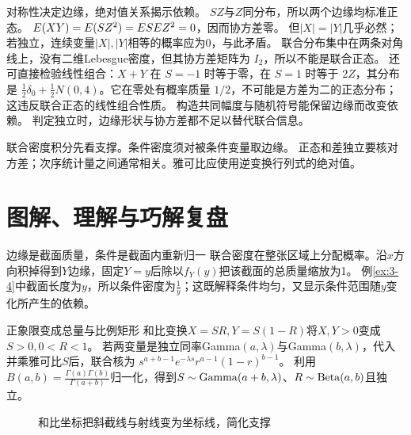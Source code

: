 {对称性决定边缘，绝对值关系揭示依赖。}
{$SZ$与$Z$同分布，所以两个边缘均标准正态。
$E(XY)=E(SZ^2)=E SE Z^2=0$，因而协方差零。
但$|X|=|Y|$几乎必然；若独立，连续变量$|X|,|Y|$相等的概率应为0，与此矛盾。
联合分布集中在两条对角线上，没有二维Lebesgue密度，但其协方差矩阵为 $I_2$，所以不能是联合正态。
还可直接检验线性组合：$X+Y$ 在 $S=-1$ 时等于零，在 $S=1$ 时等于 $2Z$，其分布是 $\tfrac12\delta_0+\tfrac12N(0,4)$。它在零处有概率质量 $1/2$，不可能是方差为二的正态分布；这违反联合正态的线性组合性质。}
{构造共同幅度与随机符号能保留边缘而改变依赖。}
{判定独立时，边缘形状与协方差都不足以替代联合信息。}
\begin{warning}
联合密度积分先看支撑。条件密度须对被条件变量取边缘。
正态和差独立要核对方差；次序统计量之间通常相关。雅可比应使用逆变换行列式的绝对值。
\end{warning}

\section*{图解、理解与巧解复盘}
\begin{insight}{边缘是截面质量，条件是截面内重新归一}
联合密度在整张区域上分配概率。沿$x$方向积掉得到$Y$边缘，固定$Y=y$后除以$f_Y(y)$把该截面的总质量缩放为1。
例\ref{ex:3-4}中截面长度为$y$，所以条件密度为$\frac{1}{y}$；这既解释条件均匀，又显示条件范围随$y$变化所产生的依赖。
\end{insight}
\begin{clevertrick}{正象限变成总量与比例矩形}
和比变换$X=SR,Y=S(1-R)$将$X,Y>0$变成$S>0,0<R<1$。
若两变量是独立同率Gamma$(a,\lambda)$与Gamma$(b,\lambda)$，代入并乘雅可比$S$后，联合核为
$s^{a+b-1}e^{-\lambda s}r^{a-1}(1-r)^{b-1}$。
利用$B(a,b)=\frac{\Gamma(a)\Gamma(b)}{\Gamma(a+b)}$归一化，得到$S\sim\operatorname{Gamma}(a+b,\lambda)$、$R\sim\operatorname{Beta}(a,b)$且独立。
\end{clevertrick}
\begin{figure}[htbp]\centering
{}\caption{和比坐标把斜截线与射线变为坐标线，简化支撑}\label{fig:sum-ratio}\end{figure}

